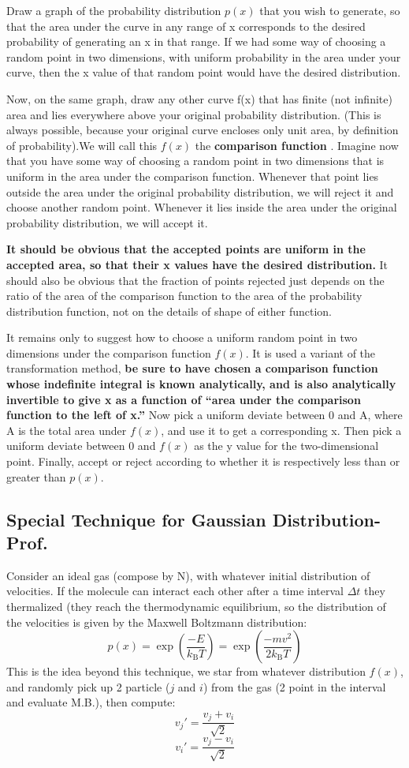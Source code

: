 Draw a graph of the probability distribution $p(x)$ that you wish to generate, so that the area under the curve in any range of x corresponds to the desired probability of generating an x in that range. If we had some way of choosing a random point in two dimensions, with uniform probability in the area under your curve, then the x value of that random point would have the desired distribution.

Now, on the same graph, draw any other curve f(x) that has finite (not infinite) area and lies everywhere above your original probability distribution. (This is always possible, because your original curve encloses only unit area, by definition of probability).We will call this $f(x)$ the \textbf{comparison function} . Imagine now that you have some way of choosing a random point in two dimensions that is uniform in the area under the comparison function. Whenever that point lies outside the area under the original probability distribution, we will reject it and choose another random point.
Whenever it lies inside the area under the original probability distribution, we will accept it.

\textbf{It should be obvious that the accepted points are uniform in the accepted area, so that their x values have the desired distribution.} It should also be obvious that the fraction of points rejected just depends on the ratio of the area of the comparison function to the area of the probability distribution function, not on the details of shape of either function.

It remains only to suggest how to choose a uniform random point in two dimensions under the comparison function $f(x)$. It is used a variant of the transformation method,\textbf{ be sure to have chosen a comparison function whose indefinite integral is known analytically, and is also analytically invertible to give x as a function of “area under the comparison function to the left of x.”} Now pick a uniform deviate between 0 and A, where A is the total area under $f(x)$, and use it to get a corresponding x.
Then pick a uniform deviate between 0 and $f(x)$ as the y value for the two-dimensional point. Finally, accept or reject according to whether it is respectively less than or greater than $p(x)$.

\subsection{Special Technique for Gaussian Distribution-Prof.}
Consider an ideal gas (compose by N), with whatever initial distribution of velocities. If the molecule can interact each other after a time interval $\Delta t$ they thermalized (they reach the thermodynamic equilibrium, so the distribution of the velocities is given by the Maxwell Boltzmann distribution: 
\[p(x) = \exp{\left(\frac{-E}{k_{\text{B}}T}\right)} = \exp{\left(\frac{-mv^2}{2k_{\text{B}}T}\right)}\]
This is the idea beyond this technique, we star from whatever distribution $f(x)$, and randomly pick up 2 particle ($j$ and $i$) from the gas (2 point in the interval and evaluate M.B.), then compute:
\[ v_{j}' = \frac{v_{j} + v_{i}}{\sqrt{2}} \]
\[ v_{i}' = \frac{v_{j} - v_{i}}{\sqrt{2}} \]

